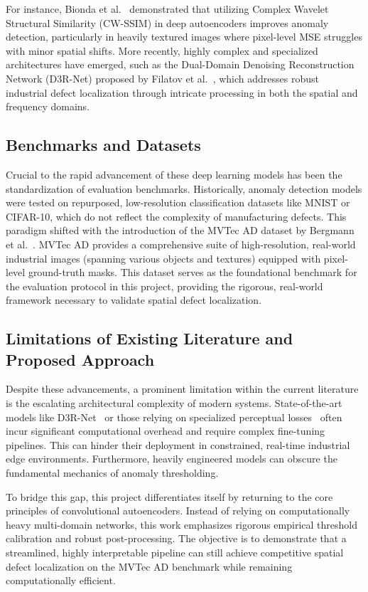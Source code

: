 \documentclass[10pt,twocolumn,a4paper]{article}
\begin{document}
For instance, Bionda et al.~\cite{bionda2022deep} demonstrated that utilizing Complex Wavelet Structural Similarity (CW-SSIM) in deep autoencoders improves anomaly detection, particularly in heavily textured images where pixel-level MSE struggles with minor spatial shifts. More recently, highly complex and specialized architectures have emerged, such as the Dual-Domain Denoising Reconstruction Network (D3R-Net) proposed by Filatov et al.~\cite{filatov2026d3rnet}, which addresses robust industrial defect localization through intricate processing in both the spatial and frequency domains.

\subsection{Benchmarks and Datasets}
Crucial to the rapid advancement of these deep learning models has been the standardization of evaluation benchmarks. Historically, anomaly detection models were tested on repurposed, low-resolution classification datasets like MNIST or CIFAR-10, which do not reflect the complexity of manufacturing defects. This paradigm shifted with the introduction of the MVTec AD dataset by Bergmann et al.~\cite{bergmann2019mvtec}. MVTec AD provides a comprehensive suite of high-resolution, real-world industrial images (spanning various objects and textures) equipped with pixel-level ground-truth masks. This dataset serves as the foundational benchmark for the evaluation protocol in this project, providing the rigorous, real-world framework necessary to validate spatial defect localization.

\subsection{Limitations of Existing Literature and Proposed Approach}
Despite these advancements, a prominent limitation within the current literature is the escalating architectural complexity of modern systems. State-of-the-art models like D3R-Net~\cite{filatov2026d3rnet} or those relying on specialized perceptual losses~\cite{bionda2022deep} often incur significant computational overhead and require complex fine-tuning pipelines. This can hinder their deployment in constrained, real-time industrial edge environments. Furthermore, heavily engineered models can obscure the fundamental mechanics of anomaly thresholding.

To bridge this gap, this project differentiates itself by returning to the core principles of convolutional autoencoders. Instead of relying on computationally heavy multi-domain networks, this work emphasizes rigorous empirical threshold calibration and robust post-processing. The objective is to demonstrate that a streamlined, highly interpretable pipeline can still achieve competitive spatial defect localization on the MVTec AD benchmark while remaining computationally efficient.
\end{document}
